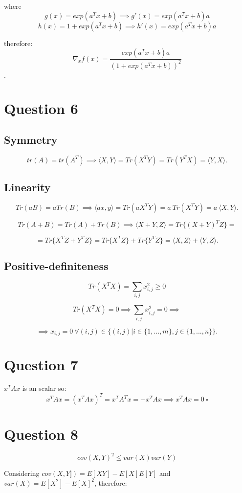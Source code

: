 \documentclass[a4paper]{article}
\begin{document}
where
$$g(x) = exp(a^T x + b) \implies g'(x) = exp(a^T x + b) a$$
$$h(x) = 1 + exp(a^T x + b) \implies h'(x) = exp(a^T x + b) a$$

therefore:
$$
\nabla_xf(x) = \frac{exp(a^T x + b) a}{(1 + exp(a^T x + b)) ^ 2}
$$.

\section{Question 6}
\subsection{Symmetry}
$$
tr(A) = tr(A^T) \implies \langle X,Y \rangle = Tr(X^T Y) = Tr(Y^T X) = \langle Y, X \rangle.
$$

\subsection{Linearity}
$$
Tr(aB) = a Tr(B) \implies \langle a x, y \rangle = Tr(a X^T Y) = a \ Tr(X^T Y) = a \ \langle X, Y \rangle.
$$

$$
Tr(A + B) = Tr(A) + Tr(B) \implies \langle X + Y, Z \rangle = Tr\{(X+Y)^T Z\} =
$$

$$
= Tr\{X^T Z + Y^T Z\} = Tr\{X^T Z\} + Tr\{Y^T Z\} = \langle X, Z \rangle + \langle Y, Z \rangle.
$$

\subsection{Positive-definiteness}
$$
Tr(X^T X) = \sum_{i,j} x_{i,j}^2 \geq 0
$$

$$
Tr(X^T X) = 0 \implies \sum_{i,j} x_{i,j}^2 = 0 \implies 
$$

$$
\implies  x_{i,j} = 0 \ \forall (i,j) \in \{(i,j) | i \in \{1,...,m\}, j \in \{1,...,n\}\}.
$$

\section{Question 7}
$x^TAx$ is an scalar so:
$$
x^TAx = (x^TAx)^T = x^TA^Tx = -x^TAx \implies x^TAx = 0 \ \square
$$

\section{Question 8}
$$
cov(X,Y)^2 \leq var(X) var(Y)
$$

Considering $cov(X,Y]) = E[XY] - E[X]E[Y]$ and $var(X) = E[X^2] - E[X]^2$, therefore:
\end{document}
